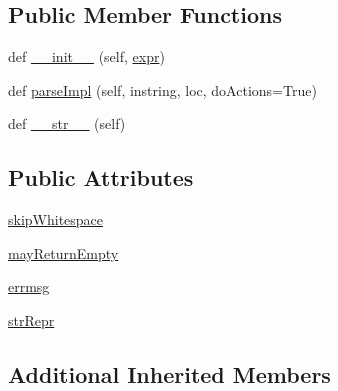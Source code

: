 \subsection*{Public Member Functions}
\begin{DoxyCompactItemize}
\item 
def \hyperlink{classpip_1_1__vendor_1_1pyparsing_1_1NotAny_a4787877554c6308b208131f295e55d51}{\+\_\+\+\_\+init\+\_\+\+\_\+} (self, \hyperlink{classpip_1_1__vendor_1_1pyparsing_1_1ParseElementEnhance_af574b49a0a7d914693fdaa833df7098f}{expr})
\item 
def \hyperlink{classpip_1_1__vendor_1_1pyparsing_1_1NotAny_ac7b82f5eb8bbc5630d4931f1f3d3b4fc}{parse\+Impl} (self, instring, loc, do\+Actions=True)
\item 
def \hyperlink{classpip_1_1__vendor_1_1pyparsing_1_1NotAny_a86b972a48e0d359db7c23695e39755bf}{\+\_\+\+\_\+str\+\_\+\+\_\+} (self)
\end{DoxyCompactItemize}
\subsection*{Public Attributes}
\begin{DoxyCompactItemize}
\item 
\hyperlink{classpip_1_1__vendor_1_1pyparsing_1_1NotAny_a18cbee3d5a4698f4b9d973d653a34a29}{skip\+Whitespace}
\item 
\hyperlink{classpip_1_1__vendor_1_1pyparsing_1_1NotAny_a04144b2cfab12ba12b5f3e52db5252d2}{may\+Return\+Empty}
\item 
\hyperlink{classpip_1_1__vendor_1_1pyparsing_1_1NotAny_a710fb962ef1c4ac785094c7974333ef0}{errmsg}
\item 
\hyperlink{classpip_1_1__vendor_1_1pyparsing_1_1NotAny_aa06f817b15de4d3ae7e6e92d9ca7fd9d}{str\+Repr}
\end{DoxyCompactItemize}
\subsection*{Additional Inherited Members}


